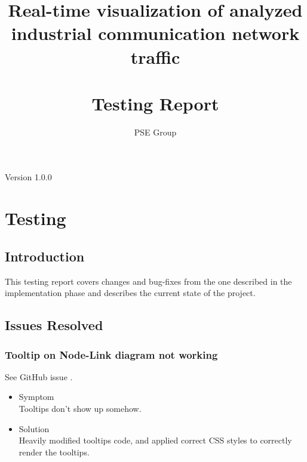 \documentclass[oneside, english, final]{design}
\author{PSE Group}
\title{Real-time visualization of analyzed industrial communication network traffic\\ \hfill \\Testing Report}
\begin{document}
\nocite{*}

\setpdf

\maketitle


\hfill

\begin{center}
      \large{Version 1.0.0}
\end{center}


\thispagestyle{empty}
\begin{abstract}
      \thispagestyle{empty}
\end{abstract}

\thispagestyle{empty}
\newpage
\thispagestyle{empty}
\tableofcontents
\cleardoublepage
\setcounter{page}{1}


\section{Testing}\label{sec:intro}
\subsection{Introduction}

This testing report covers changes and bug-fixes from the one described in the implementation phase
and describes the current state of the project.

\subsection{Issues Resolved}

\subsubsection{Tooltip on Node-Link diagram not working}

See GitHub issue \href{https://github.com/DHSTTOS/implementation/issues/69}{\color{blue}{\#69}}.

\begin{itemize}
      \item{Symptom
            \\
            Tooltips don't show up somehow.}

      \item{Solution
            \\
            Heavily modified tooltips code, and applied correct CSS styles to correctly render the tooltips.}
\end{itemize}
\end{document}
